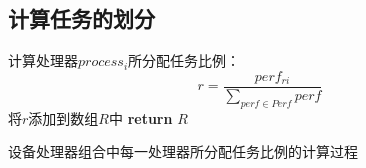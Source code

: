 \subsection{计算任务的划分}
\label{chapter:chapter4-3-2}

\begin{algorithm}[htbp]
  \small
  \SetAlgoLined
    \begin{spacing}{0.9}
     {
        计算处理器$process_i$所分配任务比例：
        $$r=\frac{perf_{ri}}{\sum_{perf \in Perf}perf}$$
        将$r$添加到数组$R$中\;
    }
    \textbf{return} $R$\;
   \end{spacing}
  \caption{设备处理器组合中每一处理器所分配任务比例的计算过程}
  \label{algo:algorithm9}
\end{algorithm}